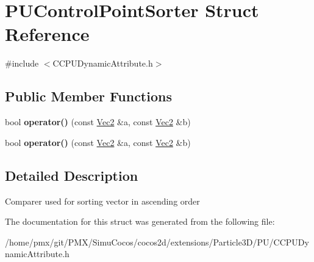 \hypertarget{structPUControlPointSorter}{}\section{P\+U\+Control\+Point\+Sorter Struct Reference}
\label{structPUControlPointSorter}


{\ttfamily \#include $<$C\+C\+P\+U\+Dynamic\+Attribute.\+h$>$}

\subsection*{Public Member Functions}
\begin{DoxyCompactItemize}
\item 
\mbox{\label{structPUControlPointSorter_ab26fff995693598d81e9ac5c1cc33c6f}} 
bool {\bfseries operator()} (const \hyperlink{classVec2}{Vec2} \&a, const \hyperlink{classVec2}{Vec2} \&b)
\item 
\mbox{\label{structPUControlPointSorter_ab26fff995693598d81e9ac5c1cc33c6f}} 
bool {\bfseries operator()} (const \hyperlink{classVec2}{Vec2} \&a, const \hyperlink{classVec2}{Vec2} \&b)
\end{DoxyCompactItemize}


\subsection{Detailed Description}
Comparer used for sorting vector in ascending order 

The documentation for this struct was generated from the following file\+:\begin{DoxyCompactItemize}
\item 
/home/pmx/git/\+P\+M\+X/\+Simu\+Cocos/cocos2d/extensions/\+Particle3\+D/\+P\+U/C\+C\+P\+U\+Dynamic\+Attribute.\+h\end{DoxyCompactItemize}
